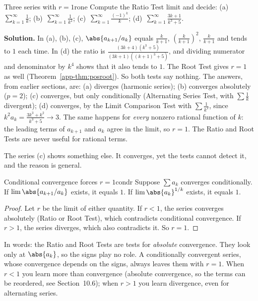 \documentclass[11pt]{article}
\begin{document}
\begin{exmp}{Three series with $r=1$}{rone}
Compute the Ratio Test limit and decide: (a)~$\displaystyle\sum_{k=1}^\infty\frac1k$; (b)~$\displaystyle\sum_{k=1}^\infty\frac1{k^2}$; (c)~$\displaystyle\sum_{k=1}^\infty\frac{(-1)^k}k$; (d)~$\displaystyle\sum_{k=1}^\infty\frac{3k+1}{k^3+5}$.

\textbf{Solution.} In (a), (b), (c), $\abs{a_{k+1}/a_k}$ equals $\frac k{k+1}$, $\left(\frac k{k+1}\right)^2$, $\frac k{k+1}$ and tends to $1$ each time. In (d) the ratio is $\frac{(3k+4)(k^3+5)}{(3k+1)\left((k+1)^3+5\right)}$, and dividing numerator and denominator by $k^4$ shows that it also tends to $1$. The Root Test gives $r=1$ as well (Theorem~\ref{app-thm:posroot}). So both tests say nothing. The answers, from earlier sections, are: (a) diverges (harmonic series); (b) converges absolutely ($p=2$); (c) converges, but only conditionally (Alternating Series Test, with $\sum\frac1k$ divergent); (d) converges, by the Limit Comparison Test with $\sum\frac1{k^2}$, since $k^2a_k=\frac{3k^3+k^2}{k^3+5}\to3$.
The same happens for \emph{every} nonzero rational function of $k$: the leading terms of $a_{k+1}$ and $a_k$ agree in the limit, so $r=1$. The Ratio and Root Tests are never useful for rational terms.
\end{exmp}

The series (c) shows something else. It converges, yet the tests cannot detect it, and the reason is general.

\begin{thm}{Conditional convergence forces $r=1$}{condr}
Suppose $\sum a_k$ converges conditionally. If $\lim\abs{a_{k+1}/a_k}$ exists, it equals $1$. If $\lim\abs{a_k}^{1/k}$ exists, it equals $1$.
\end{thm}
\begin{proof}
Let $r$ be the limit of either quantity. If $r<1$, the series converges absolutely (Ratio or Root Test), which contradicts conditional convergence. If $r>1$, the series diverges, which also contradicts it. So $r=1$.
\end{proof}

In words: the Ratio and Root Tests are tests for \emph{absolute} convergence. They look only at $\abs{a_k}$, so the signs play no role. A conditionally convergent series, whose convergence depends on the signs, always leaves them with $r=1$. When $r<1$ you learn more than convergence (absolute convergence, so the terms can be reordered, see Section~10.6); when $r>1$ you learn divergence, even for alternating series.
\end{document}
